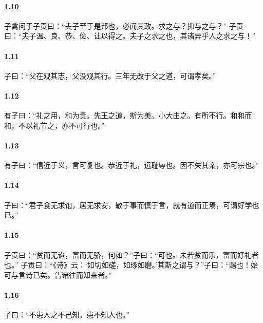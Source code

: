 \documentclass[main.tex]{subfiles}
\begin{document}
\paragraph{1.10}
子禽问于子贡曰：“夫子至于是邦也，必闻其政。求之与？抑与之与？”
子贡曰：“夫子温、良、恭、俭、让以得之。夫子之求之也，其诸异乎人之求之与！”

\paragraph{1.11}
子曰：“父在观其志，父没观其行。三年无改于父之道，可谓孝矣。”

\paragraph{1.12}
有子曰：“礼之用，和为贵。先王之道，斯为美。小大由之。有所不行。和和而和，不以礼节之，亦不可行也。”

\paragraph{1.13}
有子曰：“信近于义，言可复也。恭近于礼，远耻辱也。因不失其亲，亦可宗也。”

\paragraph{1.14}
子曰：“君子食无求饱，居无求安，敏于事而慎于言，就有道而正焉，可谓好学也已。”

\paragraph{1.15}
子贡曰：“贫而无谄，富而无骄，何如？”子曰：“可也。未若贫而乐，富而好礼者也。”
子贡曰：“《诗》云：‘如切如磋，如琢如磨。’其斯之谓与？”子曰：“赐也！始可与言诗已矣。告诸往而知来者。”

\paragraph{1.16}
子曰：“不患人之不己知，患不知人也。”
\end{document}
